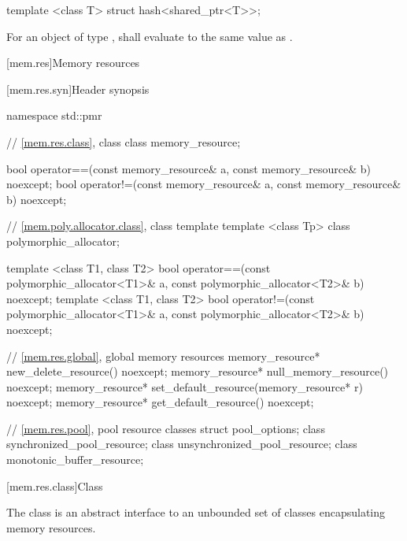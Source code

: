 %
\begin{itemdecl}
template <class T> struct hash<shared_ptr<T>>;
\end{itemdecl}

\begin{itemdescr}
\pnum
For an object  of type ,
 shall evaluate to
the same value as .
\end{itemdescr}%

[mem.res]{Memory resources}

[mem.res.syn]{Header  synopsis}

%
%
\begin{codeblock}
namespace std::pmr {
  // \ref{mem.res.class}, class 
  class memory_resource;

  bool operator==(const memory_resource& a, const memory_resource& b) noexcept;
  bool operator!=(const memory_resource& a, const memory_resource& b) noexcept;

  // \ref{mem.poly.allocator.class}, class template 
  template <class Tp> class polymorphic_allocator;

  template <class T1, class T2>
    bool operator==(const polymorphic_allocator<T1>& a,
                    const polymorphic_allocator<T2>& b) noexcept;
  template <class T1, class T2>
    bool operator!=(const polymorphic_allocator<T1>& a,
                    const polymorphic_allocator<T2>& b) noexcept;

  // \ref{mem.res.global}, global memory resources
  memory_resource* new_delete_resource() noexcept;
  memory_resource* null_memory_resource() noexcept;
  memory_resource* set_default_resource(memory_resource* r) noexcept;
  memory_resource* get_default_resource() noexcept;

  // \ref{mem.res.pool}, pool resource classes
  struct pool_options;
  class synchronized_pool_resource;
  class unsynchronized_pool_resource;
  class monotonic_buffer_resource;
}
\end{codeblock}

[mem.res.class]{Class }

\pnum
The  class is an abstract interface to an unbounded set of classes encapsulating memory resources.

